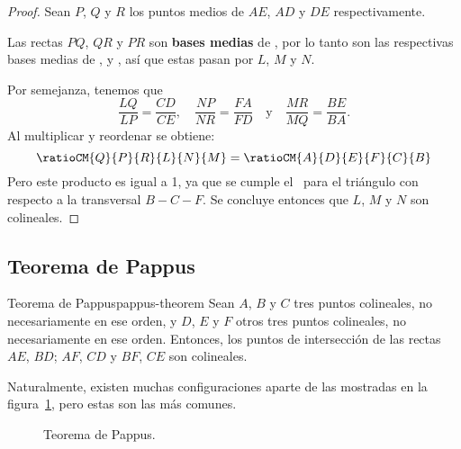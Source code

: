 \begin{proof}
    Sean $P$, $Q$ y $R$ los puntos medios de $AE$, $AD$ y $DE$ respectivamente.

    \begin{figure}[H]
        \centering
        
    \end{figure}

    Las rectas $PQ$, $QR$ y $PR$ son \textbf{bases medias} de , por lo tanto son las respectivas bases medias de ,  y , así que estas pasan por $L$, $M$ y $N$.

    Por semejanza, tenemos que
    \[
        \frac{LQ}{LP} = \frac{CD}{CE},\quad \frac{NP}{NR} = \frac{FA}{FD}\quad \text{y} \quad \frac{MR}{MQ} = \frac{BE}{BA}.
    \]
    Al multiplicar y reordenar se obtiene:
    \[
        \ratioCM{Q}{P}{R}{L}{N}{M} = \ratioCM{A}{D}{E}{F}{C}{B}
    \]
    Pero este producto es igual a 1, ya que se cumple el~ para el triángulo  con respecto a la transversal $B - C - F$.
    Se concluye entonces que $L$, $M$ y $N$ son colineales.
\end{proof}




\subsection{Teorema de Pappus}

\begin{section-theorem.tcb}{Teorema de Pappus}{pappus-theorem}
    Sean $A$, $B$ y $C$ tres puntos colineales, no necesariamente en ese orden, y $D$, $E$ y $F$ otros tres puntos colineales, no necesariamente en ese orden.
    Entonces, los puntos de intersección de las rectas $AE$, $BD$; $AF$, $CD$ y $BF$, $CE$ son colineales.
\end{section-theorem.tcb}

Naturalmente, existen muchas configuraciones aparte de las mostradas en la figura~\ref{fig:pappus-theorem}, pero estas son las más comunes.

\begin{figure}[H]
    \centering
    
    \caption{Teorema de Pappus.}
    \label{fig:pappus-theorem}
\end{figure}

